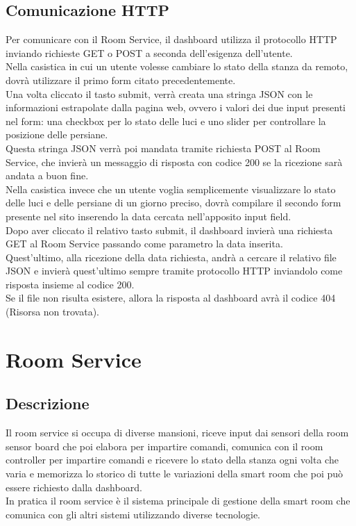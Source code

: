 \documentclass[a4paper]{report}
\begin{document}
\section{Comunicazione HTTP}
Per comunicare con il Room Service, il dashboard utilizza il protocollo HTTP inviando richieste GET o POST a seconda dell'esigenza dell'utente.\\
Nella casistica in cui un utente volesse cambiare lo stato della stanza da remoto, dovrà utilizzare il primo form citato precedentemente.\\
Una volta cliccato il tasto submit, verrà creata una stringa JSON con le informazioni estrapolate dalla pagina web, ovvero i valori dei due input presenti nel form: una checkbox per lo stato delle luci e uno slider per controllare la posizione delle persiane.\\
Questa stringa JSON verrà poi mandata tramite richiesta POST al Room Service, che invierà un messaggio di risposta con codice 200 se la ricezione sarà andata a buon fine.\\
Nella casistica invece che un utente voglia semplicemente visualizzare lo stato delle luci e delle persiane di un giorno preciso, dovrà compilare il secondo form presente nel sito inserendo la data cercata nell'apposito input field. \\
Dopo aver cliccato il relativo tasto submit, il dashboard invierà una richiesta GET al Room Service passando come parametro la data inserita.\\
Quest'ultimo, alla ricezione della data richiesta, andrà a cercare il relativo file JSON e invierà quest'ultimo sempre tramite protocollo HTTP inviandolo come risposta insieme al codice 200.\\
Se il file non risulta esistere, allora la risposta al dashboard avrà il codice 404 (Risorsa non trovata).




\chapter{Room Service}
\section{Descrizione}
Il room service si occupa di diverse mansioni, riceve input dai sensori della room sensor board che poi elabora per impartire comandi, comunica con il room controller per impartire comandi e ricevere lo stato della stanza ogni volta che varia e memorizza lo storico di tutte le variazioni della smart room che poi può essere richiesto dalla dashboard.\\
In pratica il room service è il sistema principale di gestione della smart room che comunica con gli altri sistemi utilizzando diverse tecnologie.
\end{document}

